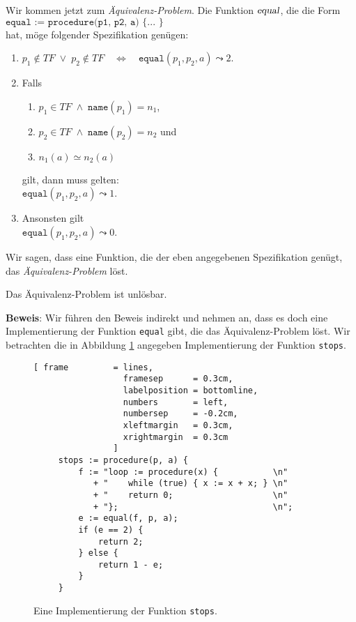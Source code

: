 \noindent
Wir kommen jetzt zum \emph{\"Aquivalenz-Problem}.  Die Funktion $\textsl{equal}$, die die Form
\\[0.2cm]
\hspace*{1.3cm}
$\texttt{equal := procedure(p1, p2, a) \{ ... \}}$
\\[0.2cm]
hat, m\"oge folgender Spezifikation gen\"ugen:
\begin{enumerate}
\item $p_1 \not\in T\!F \;\vee\; p_2 \not\in T\!F \quad\Leftrightarrow\quad \mathtt{equal}(p_1, p_2, a) \leadsto 2$.
\item Falls 
  \begin{enumerate}
  \item $p_1 \in T\!F \;\wedge\; \mathtt{name}(p_1) = n_1$,
  \item $p_2 \in T\!F \;\wedge\; \mathtt{name}(p_2) = n_2$ \quad und
  \item $n_1(a) \simeq n_2(a)$
  \end{enumerate}
    gilt, dann muss gelten: \\[0.1cm]
   \hspace*{1.3cm}  $\mathtt{equal}(p_1, p_2, a) \leadsto 1$.
\item Ansonsten gilt \\[0.1cm]
      \hspace*{1.3cm} $\mathtt{equal}(p_1, p_2, a) \leadsto 0$.
\end{enumerate}
Wir sagen, dass eine Funktion, die der eben angegebenen Spezifikation gen\"ugt, das
\emph{\"Aquivalenz-Problem} l\"ost.

\begin{Theorem}[Rice, 1953]
Das \"Aquivalenz-Problem ist unl\"osbar.  
\end{Theorem}

\noindent
\textbf{Beweis}:
Wir f\"uhren den Beweis indirekt und nehmen
an, dass es doch eine Implementierung der Funktion \texttt{equal} gibt, die das
\"Aquivalenz-Problem l\"ost.  Wir betrachten die in Abbildung 
\ref{fig:stops} angegeben Implementierung der Funktion \texttt{stops}.


\begin{figure}[!h]
  \centering
\begin{Verbatim}[ frame         = lines, 
                  framesep      = 0.3cm, 
                  labelposition = bottomline,
                  numbers       = left,
                  numbersep     = -0.2cm,
                  xleftmargin   = 0.3cm,
                  xrightmargin  = 0.3cm
                ]
     stops := procedure(p, a) {
         f := "loop := procedure(x) {           \n"
            + "    while (true) { x := x + x; } \n"
            + "    return 0;                    \n"
            + "};                               \n";                 
         e := equal(f, p, a);
         if (e == 2) {
             return 2;
         } else {
             return 1 - e;
         }
     }
\end{Verbatim}
  \vspace*{-0.3cm}
  \caption{Eine Implementierung der Funktion \texttt{stops}.}
  \label{fig:stops}
\end{figure}

